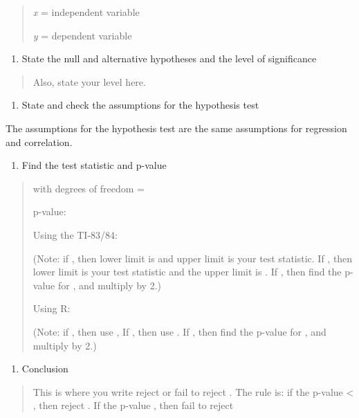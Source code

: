 \documentclass[]{book}
\providecommand{\tightlist}{%
  \setlength{\itemsep}{0pt}\setlength{\parskip}{0pt}}
\begin{document}
\begin{quote}
\emph{x} = independent variable

\emph{y} = dependent variable
\end{quote}

\begin{enumerate}
\def\labelenumi{\arabic{enumi}.}
\setcounter{enumi}{1}
\tightlist
\item
  State the null and alternative hypotheses and the level of significance
\end{enumerate}

\begin{quote}
Also, state your level here.
\end{quote}

\begin{enumerate}
\def\labelenumi{\arabic{enumi}.}
\setcounter{enumi}{2}
\tightlist
\item
  State and check the assumptions for the hypothesis test
\end{enumerate}

The assumptions for the hypothesis test are the same assumptions for regression and correlation.

\begin{enumerate}
\def\labelenumi{\arabic{enumi}.}
\setcounter{enumi}{3}
\tightlist
\item
  Find the test statistic and p-value
\end{enumerate}

\begin{quote}
with degrees of freedom =

p-value:

Using the TI-83/84:

(Note: if , then lower limit is and upper limit is your test
statistic. If , then lower limit is your test statistic and the upper
limit is . If , then find the p-value for , and multiply by 2.)

Using R:

(Note: if , then use , If , then use . If , then find the p-value for
, and multiply by 2.)
\end{quote}

\begin{enumerate}
\def\labelenumi{\arabic{enumi}.}
\setcounter{enumi}{4}
\tightlist
\item
  Conclusion
\end{enumerate}

\begin{quote}
This is where you write reject or fail to reject . The rule is: if the p-value \textless{} , then reject . If the p-value , then fail to reject
\end{quote}
\end{document}
